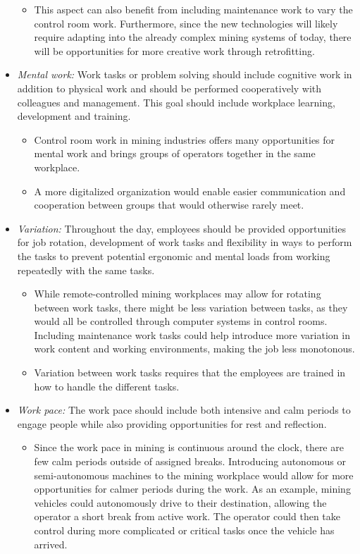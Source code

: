\documentclass[
  12pt,
]{scrbook}
\providecommand{\tightlist}{%
  \setlength{\itemsep}{0pt}\setlength{\parskip}{0pt}}
\begin{document}
\begin{itemize}
  \begin{itemize}
  \tightlist
  \item
    This aspect can also benefit from including maintenance work to vary the control room work. Furthermore, since the new technologies will likely require adapting into the already complex mining systems of today, there will be opportunities for more creative work through retrofitting.
  \end{itemize}
\item
  \emph{Mental work:} Work tasks or problem solving should include cognitive work in addition to physical work and should be performed cooperatively with colleagues and management. This goal should include workplace learning, development and training.

  \begin{itemize}
  \item
    Control room work in mining industries offers many opportunities for mental work and brings groups of operators together in the same workplace.
  \item
    A more digitalized organization would enable easier communication and cooperation between groups that would otherwise rarely meet.
  \end{itemize}
\item
  \emph{Variation:} Throughout the day, employees should be provided opportunities for job rotation, development of work tasks and flexibility in ways to perform the tasks to prevent potential ergonomic and mental loads from working repeatedly with the same tasks.

  \begin{itemize}
  \item
    While remote-controlled mining workplaces may allow for rotating between work tasks, there might be less variation between tasks, as they would all be controlled through computer systems in control rooms. Including maintenance work tasks could help introduce more variation in work content and working environments, making the job less monotonous.
  \item
    Variation between work tasks requires that the employees are trained in how to handle the different tasks.
  \end{itemize}
\item
  \emph{Work pace:} The work pace should include both intensive and calm periods to engage people while also providing opportunities for rest and reflection.

  \begin{itemize}
  \tightlist
  \item
    Since the work pace in mining is continuous around the clock, there are few calm periods outside of assigned breaks. Introducing autonomous or semi-autonomous machines to the mining workplace would allow for more opportunities for calmer periods during the work. As an example, mining vehicles could autonomously drive to their destination, allowing the operator a short break from active work. The operator could then take control during more complicated or critical tasks once the vehicle has arrived.
  \end{itemize}
\end{itemize}
\end{document}
